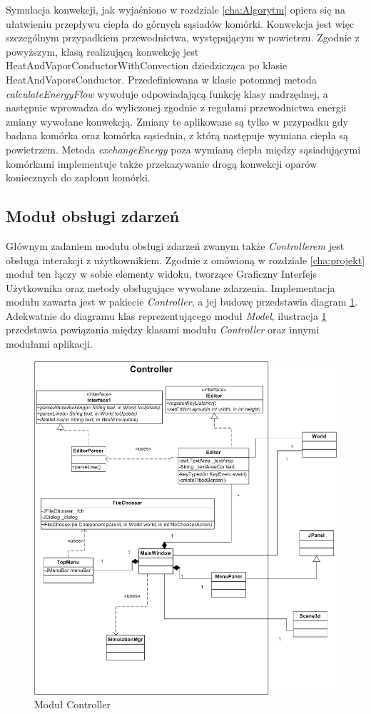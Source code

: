 Symulacja konwekcji, jak wyjaśniono w rozdziale \ref{cha:Algorytm} opiera się na ułatwieniu przepływu ciepła do górnych sąsiadów komórki. Konwekcja jest więc szczególnym przypadkiem przewodnictwa, występującym w powietrzu. Zgodnie z powyższym, klasą realizującą konwekcję jest HeatAndVaporConductorWithConvection dziedzicząca po klasie HeatAndVaporsConductor. Przedefiniowana w  klasie potomnej metoda \textit{calculateEnergyFlow} wywołuje odpowiadającą funkcję klasy nadrzędnej, a następnie wprowadza do wyliczonej zgodnie z regułami przewodnictwa energii zmiany wywołane konwekcją. Zmiany te aplikowane są tylko w przypadku gdy badana komórka oraz komórka sąsiednia, z którą następuje wymiana ciepła są powietrzem. Metoda \textit{exchangeEnergy} poza wymianą ciepła między sąsiadującymi komórkami implementuje także przekazywanie drogą konwekcji oparów koniecznych do zapłonu komórki.

\subsection {Moduł obsługi zdarzeń}
Głównym zadaniem modułu obsługi zdarzeń zwanym także \textit{Controllerem} jest obsługa interakcji z użytkownikiem. 
Zgodnie z omówioną w rozdziale \ref{cha:projekt} moduł ten łączy w sobie elementy widoku, tworzące Graficzny Interfejs Użytkownika oraz metody obsługujące wywołane zdarzenia.
Implementacja modułu zawarta jest w pakiecie \textit{Controller}, a jej budowę przedstawia diagram \ref{uml_kontroler}. Adekwatnie do diagramu klas reprezentującego moduł \textit{Model},
ilustracja \ref{uml_kontroler} przedstawia powiązania między klasami modułu \textit{Controller} oraz innymi modułami aplikacji.
\begin{figure}
\begin {center}
\includegraphics{uml_kontroler.png} 
\caption {Moduł Controller}
\label {uml_kontroler}
\end {center}
\end{figure}

